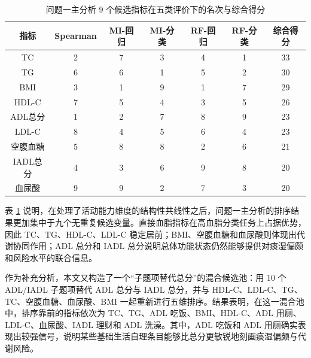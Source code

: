 \documentclass{MathorCupmodeling}
\begin{document}
				\begin{table}[H]
					\centering
					\caption{问题一主分析 9 个候选指标在五类评价下的名次与综合得分}\label{tab:q1_ranks}
					\begin{tabularx}{0.96\textwidth}{c c c c c c c}
						\toprule
						指标 & Spearman & MI-回归 & MI-分类 & RF-回归 & RF-分类 & 综合得分\\
						\midrule
						TC & 2 & 7 & 3 & 4 & 1 & 33\\
						TG & 6 & 6 & 1 & 5 & 2 & 30\\
						BMI & 3 & 1 & 9 & 1 & 7 & 29\\
						HDL-C & 7 & 5 & 4 & 3 & 5 & 26\\
						ADL总分 & 1 & 2 & 7 & 8 & 9 & 23\\
						LDL-C & 8 & 4 & 5 & 6 & 4 & 23\\
						空腹血糖 & 5 & 8 & 8 & 2 & 6 & 21\\
						IADL总分 & 4 & 3 & 6 & 9 & 8 & 20\\
						血尿酸 & 9 & 9 & 2 & 7 & 3 & 20\\
						\bottomrule
					\end{tabularx}
				\end{table}
				
					表 \ref{tab:q1_ranks} 说明，在处理了活动能力维度的结构性共线性之后，问题一主分析的排序结果更加集中于九个无重复候选变量。直接血脂指标在高血脂分类任务上占据优势，因此 TC、TG、HDL-C、LDL-C 稳定居前；BMI、空腹血糖和血尿酸则体现出代谢协同作用；ADL 总分和 IADL 总分说明总体功能状态仍然能够提供对痰湿偏颇和风险水平的联合信息。
					
					作为补充分析，本文又构造了一个“子题项替代总分”的混合候选池：用 10 个 ADL/IADL 子题项替代 ADL 总分与 IADL 总分，并与 HDL-C、LDL-C、TG、TC、空腹血糖、血尿酸、BMI 一起重新进行五维排序。结果表明，在这一混合池中，排序靠前的指标依次为 TC、TG、ADL 吃饭、BMI、HDL-C、ADL 用厕、LDL-C、血尿酸、IADL 理财和 ADL 洗澡。其中，ADL 吃饭和 ADL 用厕确实表现出较强信号，说明某些基础生活自理条目能够比总分更敏锐地刻画痰湿偏颇与代谢风险。
					
\end{document}
